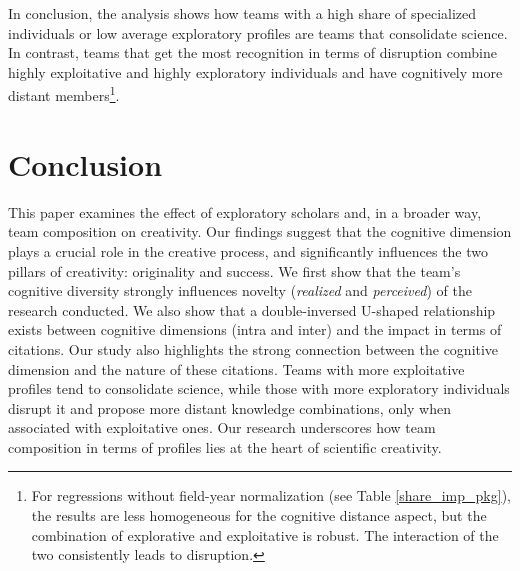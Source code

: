 

In conclusion, the analysis shows how teams with a high share of specialized individuals or low average exploratory profiles are teams that consolidate science. In contrast, teams that get the most recognition in terms of disruption combine highly exploitative and highly exploratory individuals and have cognitively more distant members\footnote{  \justifying  For regressions without field-year normalization (see Table \ref{share_imp_pkg}), the results are less homogeneous for the cognitive distance aspect, but the combination of explorative and exploitative is robust. The interaction of the two consistently leads to disruption.}.





\section{Conclusion}
\label{ccl}

This paper examines the effect of exploratory scholars and, in a broader way, team composition on creativity. Our findings suggest that the cognitive dimension plays a crucial role in the creative process, and significantly influences the two pillars of creativity: originality and success. We first show that the team's cognitive diversity strongly influences novelty (\textit{realized} and \textit{perceived}) of the research conducted. We also show that a double-inversed U-shaped relationship exists between cognitive dimensions (intra and inter) and the impact in terms of citations. Our study also highlights the strong connection between the cognitive dimension and the nature of these citations. Teams with more exploitative profiles tend to consolidate science, while those with more exploratory individuals disrupt it and propose more distant knowledge combinations, only when associated with exploitative ones. Our research underscores how team composition in terms of profiles lies at the heart of scientific creativity.


